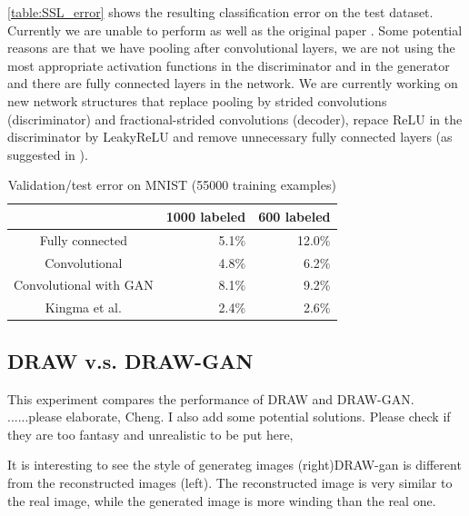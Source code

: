 \documentclass[10pt]{article}
\begin{document}
  \autoref{table:SSL_error} shows the resulting classification error on the test dataset. Currently we are unable to perform as well as the original paper \cite{kingma2014semi}. Some potential reasons are that we have pooling after convolutional layers, we are not using the most appropriate activation functions in the discriminator and in the generator and there are fully connected layers in the network. We are currently working on new network structures that replace pooling by strided convolutions (discriminator) and fractional-strided convolutions (decoder), repace ReLU in the discriminator by LeakyReLU and remove unnecessary fully connected layers (as suggested in \cite{alec2016dcgan}).

\begin{table}[!ht]
\centering
\begin{tabular}{c|r|r}
& 1000 labeled & 600 labeled\\ \hline
Fully connected &  5.1\% &  12.0\%\\
Convolutional &  4.8\% &  6.2\%\\
Convolutional with GAN &  8.1\% &  9.2\%\\
Kingma et al. \cite{kingma2014semi}
& 2.4\% & 2.6\%
\end{tabular}
\caption{Validation/test error on MNIST (55000 training examples)}
\label{table:SSL_error}
\end{table}




\subsection{DRAW v.s. DRAW-GAN}
This experiment compares the performance of DRAW and DRAW-GAN. ......please elaborate, Cheng. I also add some potential solutions. Please check if they are too fantasy and unrealistic to be put here,

It is interesting to see the style of generateg images (right)DRAW-gan is different from the reconstructed images (left). The reconstructed image is very similar to the real image, while the generated image is more winding than the real one. 
\end{document}

